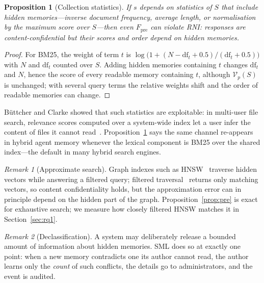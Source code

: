 \documentclass[11pt,a4paper]{article}
\newtheorem{proposition}{Proposition}
\theoremstyle{remark}
\newtheorem*{remark}{Remark}
\newcommand{\sys}{SML}
\newcommand{\vis}{\mathcal{V}}
\begin{document}
\begin{proposition}[Collection statistics]
\label{prop:stats}
If $s$ depends on statistics of $S$ that include hidden memories---inverse document frequency, average length,
or normalisation by the maximum score over $S$---then even $F_{\mathrm{pre}}$ can violate RNI: responses are
content-confidential but their scores and order depend on hidden memories.
\end{proposition}
\begin{proof}
For BM25, the weight of term $t$ is $\log\!\big(1 + (N - \mathrm{df}_t + 0.5)/(\mathrm{df}_t + 0.5)\big)$ with $N$ and
$\mathrm{df}_t$ counted over $S$. Adding hidden memories containing $t$ changes $\mathrm{df}_t$ and $N$, hence the
score of every readable memory containing $t$, although $\vis_p(S)$ is unchanged; with several query terms the
relative weights shift and the order of readable memories can change.
\end{proof}

B{\"u}ttcher and Clarke showed that such statistics are exploitable: in multi-user file search, relevance
scores computed over a system-wide index let a user infer the content of files it cannot
read~\cite{buettcher2005security}. Proposition~\ref{prop:stats} says the same channel re-appears in hybrid
agent memory whenever the lexical component is BM25 over the shared index---the default in many hybrid
search engines.

\begin{remark}[Approximate search]
Graph indexes such as HNSW~\cite{malkov2020hnsw} traverse hidden vectors while answering a filtered query;
filtered traversal~\cite{gollapudi2023filtered,patel2024acorn} returns only matching vectors, so content
confidentiality holds, but the approximation error can in principle depend on the hidden part of the graph.
Proposition~\ref{prop:pre} is exact for exhaustive search; we measure how closely filtered HNSW matches it
in Section~\ref{sec:rq1}.
\end{remark}

\begin{remark}[Declassification]
A system may deliberately release a bounded amount of information about hidden memories. \sys{} does so at
exactly one point: when a new memory contradicts one its author cannot read, the author learns only the
\emph{count} of such conflicts, the details go to administrators, and the event is audited.
\end{remark}

\end{document}
